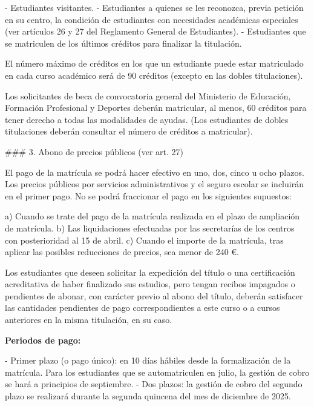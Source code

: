 \documentclass{article}
\begin{document}
\begin{itemize}
\begin{itemize}
\begin{scriptsize}
                  - Estudiantes visitantes.
                  - Estudiantes a quienes se les reconozca, previa petición en su centro, la condición de estudiantes con necesidades académicas especiales (ver artículos 26 y 27 del Reglamento General de Estudiantes).
                  - Estudiantes que se matriculen de los últimos créditos para finalizar la titulación.

                  El número máximo de créditos en los que un estudiante puede estar matriculado en cada curso académico será de 90 créditos (excepto en las dobles titulaciones).

                  Los solicitantes de beca de convocatoria general del Ministerio de Educación, Formación Profesional y Deportes deberán matricular, al menos, 60 créditos para tener derecho a todas las modalidades de ayudas. (Los estudiantes de dobles titulaciones deberán consultar el número de créditos a matricular).

                  \#\#\# 3. Abono de precios públicos (ver art. 27)

                  El pago de la matrícula se podrá hacer efectivo en uno, dos, cinco u ocho plazos. Los precios públicos por servicios administrativos y el seguro escolar se incluirán en el primer pago. No se podrá fraccionar el pago en los siguientes supuestos:

                  a) Cuando se trate del pago de la matrícula realizada en el plazo de ampliación de matrícula.
                  b) Las liquidaciones efectuadas por las secretarías de los centros con posterioridad al 15 de abril.
                  c) Cuando el importe de la matrícula, tras aplicar las posibles reducciones de precios, sea menor de 240 €.

                  Los estudiantes que deseen solicitar la expedición del título o una certificación acreditativa de haber finalizado sus estudios, pero tengan recibos impagados o pendientes de abonar, con carácter previo al abono del título, deberán satisfacer las cantidades pendientes de pago correspondientes a este curso o a cursos anteriores en la misma titulación, en su caso.

                  \textbf{Periodos de pago:}

                  - Primer plazo (o pago único): en 10 días hábiles desde la formalización de la matrícula. Para los estudiantes que se automatriculen en julio, la gestión de cobro se hará a principios de septiembre.
                  - Dos plazos: la gestión de cobro del segundo plazo se realizará durante la segunda quincena del mes de diciembre de 2025.


\end{scriptsize}
\end{itemize}
\end{itemize}
\end{document}
